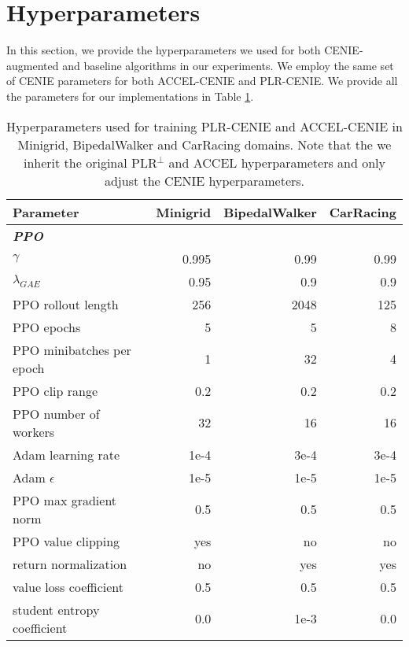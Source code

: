 \section{Hyperparameters}
In this section, we provide the hyperparameters we used for both CENIE-augmented and baseline algorithms in our experiments. We employ the same set of CENIE parameters for both ACCEL-CENIE and PLR-CENIE. We provide all the parameters for our implementations in Table \ref{tab:hyperparams_all}. 


\begin{table}[h]
    \caption{Hyperparameters used for training PLR-CENIE and ACCEL-CENIE in Minigrid, BipedalWalker and CarRacing domains. Note that the we inherit the original PLR$^\perp$ and ACCEL hyperparameters and only adjust the CENIE hyperparameters.}
    \label{tab:hyperparams_all}
    \centering
    \begin{tabular}{lrrr}
        \toprule
        Parameter         & Minigrid     & BipedalWalker & CarRacing   \\
        \midrule
        {\em \textbf{PPO}}& \text{ }    & \text{ }   & \text{ }      \\
        $\gamma$          & 0.995          & 0.99    & 0.99        \\
        $\lambda_{GAE}$   & 0.95          & 0.9      & 0.9      \\
        PPO rollout length    & 256          & 2048   & 125         \\
        PPO epochs        & 5          & 5      & 8      \\
        PPO minibatches per epoch & 1  & 32    & 4        \\
        PPO clip range    & 0.2          & 0.2  & 0.2          \\
        PPO number of workers  & 32     & 16     &  16       \\
        Adam learning rate   & 1e-4       & 3e-4  &    3e-4         \\
        Adam $\epsilon$       & 1e-5      & 1e-5     &    1e-5     \\
        PPO max gradient norm  & 0.5     & 0.5   &  0.5      \\
        PPO value clipping        & yes  & no     & no     \\
        return normalization      & no  & yes    &  yes     \\
        value loss coefficient     & 0.5 & 0.5    & 0.5       \\
        student entropy coefficient & 0.0 & 1e-3   & 0.0       \\

\end{tabular}
\end{table}
